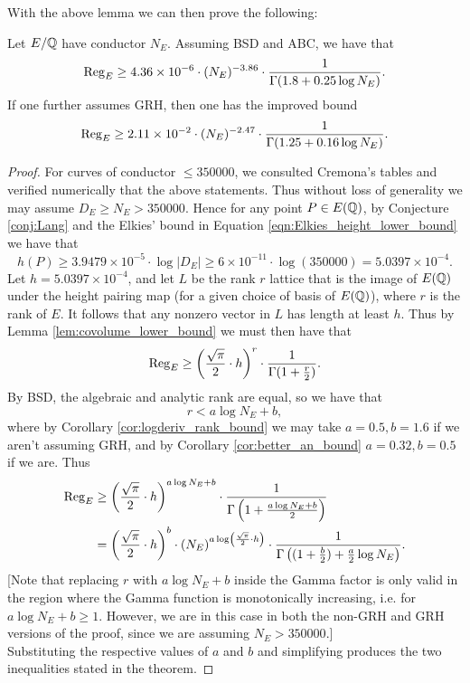 With the above lemma we can then prove the following:
\begin{theorem}\label{thm:regulator_lower_bound}
Let $E/\mathbb{Q}$ have conductor $N_E$. Assuming BSD and ABC, we have that
\begin{equation}
\operatorname{Reg}_E \ge 4.36 \times 10^{-6} \cdot (N_E)^{-3.86} \cdot \frac{1}{\Gamma(1.8+0.25 \log N_E)}.
\end{equation}
If one further assumes GRH, then one has the improved bound
\begin{equation}
\operatorname{Reg}_E \ge 2.11 \times 10^{-2} \cdot (N_E)^{-2.47} \cdot \frac{1}{\Gamma(1.25+0.16 \log N_E)}.
\end{equation}
\end{theorem}
\begin{proof}
For curves of conductor $\le 350000$, we consulted Cremona's tables and verified numerically that the above statements. Thus without loss of generality we may assume $D_E \ge N_E > 350000$. Hence for any point $P \in E(\mathbb{Q})$, by Conjecture \ref{conj:Lang} and the Elkies' bound in Equation \ref{eqn:Elkies_height_lower_bound} we have that
\begin{equation}
\hat{h}(P) \ge 3.9479\times 10^{-5} \cdot \log |D_E| \ge 6\times10^{-11} \cdot \log(350000) = 5.0397 \times 10^{-4}.
\end{equation}
Let $h = 5.0397 \times 10^{-4}$, and let $L$ be the rank $r$ lattice that is the image of $E(\mathbb{Q})$ under the height pairing map (for a given choice of basis of $E(\mathbb{Q})$), where $r$ is the rank of $E$. It follows that any nonzero vector in $L$ has length at least $h$. Thus by Lemma \ref{lem:covolume_lower_bound} we must then have that
\begin{equation*}
\operatorname{Reg}_E \ge \left(\frac{\sqrt{\pi}}{2}\cdot h\right)^{r} \cdot \frac{1}{\Gamma(1+\frac{r}{2})}.
\end{equation*}
By BSD, the algebraic and analytic rank are equal, so we have that
\begin{equation}
r < a\log N_E + b,
\end{equation}
where by Corollary \ref{cor:logderiv_rank_bound} we may take $a=0.5, b=1.6$ if we aren't assuming GRH, and by Corollary \ref{cor:better_an_bound} $a=0.32, b=0.5$ if we are. Thus
\begin{align*}
\operatorname{Reg}_E &\ge \left(\frac{\sqrt{\pi}}{2}\cdot h\right)^{a \log N_E + b} \cdot \frac{1}{\Gamma\left(1+\frac{a \log N_E + b}{2}\right)} \\
&= \left(\frac{\sqrt{\pi}}{2}\cdot h\right)^{b} \cdot \left(N_E\right)^{a\log \left(\frac{\sqrt{\pi}}{2}\cdot h\right)} \cdot \frac{1}{\Gamma\left((1+\frac{b}{2})+\frac{a}{2} \log N_E \right)}.
\end{align*}
[Note that replacing $r$ with $a\log N_E +b$ inside the Gamma factor is only valid in the region where the Gamma function is monotonically increasing, i.e. for $a\log N_E + b \ge 1$. However, we are in this case in both the non-GRH and GRH versions of the proof, since we are assuming $N_E > 350000$.] \\

Substituting the respective values of $a$ and $b$ and simplifying produces the two inequalities stated in the theorem.
\end{proof}

